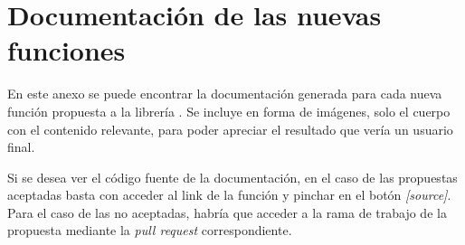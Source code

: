 \chapter{Documentación de las nuevas funciones} \label{chp:anexo_docs_funcs}

En este anexo se puede encontrar la documentación generada para cada nueva función propuesta a la librería \pvlibpy{}. Se incluye en forma de imágenes, solo el cuerpo con el contenido relevante, para poder apreciar el resultado que vería un usuario final.

Si se desea ver el código fuente de la documentación, en el caso de las propuestas aceptadas basta con acceder al link de la función y pinchar en el botón \textit{[source]}. Para el caso de las no aceptadas, habría que acceder a la \gls{rama} de trabajo de la propuesta mediante la \textit{\gls{pull request}} correspondiente.

